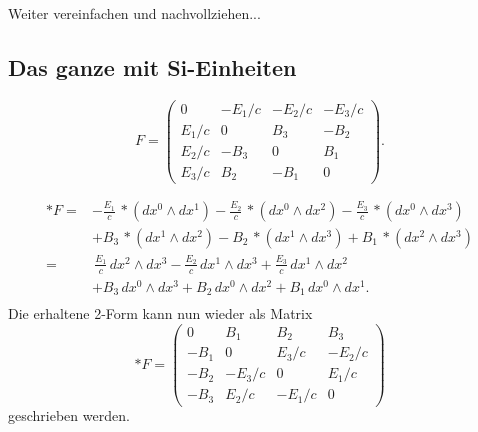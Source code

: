 Weiter vereinfachen und nachvollziehen...

\subsection{Das ganze mit Si-Einheiten}
\begin{equation}
	F = \begin{pmatrix}
		0 & -E_1/c & -E_2/c & -E_3/c \\ E_1/c & 0 & B_3 & -B_2 \\ E_2/c & -B_3 & 0 & B_1 \\ E_3/c & B_2 & -B_1 & 0 
	\end{pmatrix}.
\end{equation}

\begin{align*}
	\ast F =
	& - \frac{E_{1}}{c} \, \ast(dx^0 \wedge dx^1) - \frac{E_{2}}{c} \, \ast(dx^0 \wedge dx^2) - \frac{E_{3}}{c} \, \ast(dx^0 \wedge dx^3) \\
	& + B_3 \, \ast(dx^1 \wedge dx^2) - B_2 \, \ast(dx^1 \wedge dx^3) + B_1 \, \ast(dx^2 \wedge dx^3)\\
	= 
	& \, \frac{E_{1}}{c} \, dx^2 \wedge dx^3 - \frac{E_{2}}{c} \, dx^1 \wedge dx^3 + \frac{E_{3}}{c} \, dx^1 \wedge dx^2 \\
	& + B_3 \, dx^0 \wedge dx^3 + B_2 \, dx^0 \wedge dx^2 + B_1 \, dx^0 \wedge dx^1.\\
\end{align*}
Die erhaltene 2-Form kann nun wieder als Matrix
\begin{equation}
	\ast F = \begin{pmatrix}
		0 & B_1 & B_2 & B_3 \\ -B_1 & 0 & E_3/c & -E_2/c \\ -B_2 & -E_3/c & 0 & E_1/c \\ -B_3 & E_2/c & -E_1/c & 0 
	\end{pmatrix}
\end{equation}
geschrieben werden.


